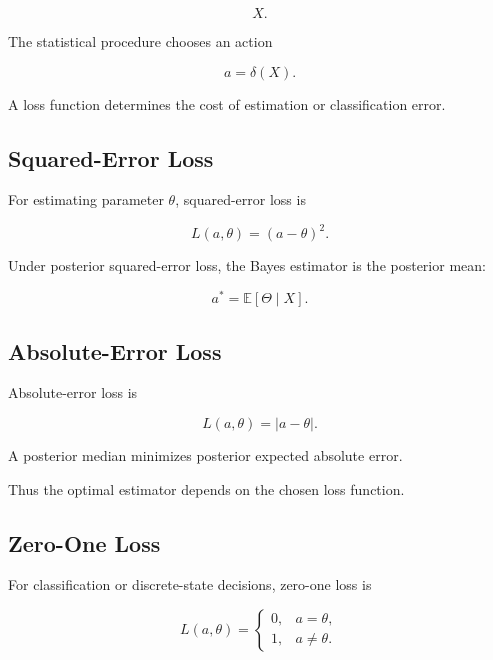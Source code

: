 \[
\boxed{
X.
}
\]

The statistical procedure chooses an action

\[
\boxed{
a=\delta(X).
}
\]

A loss function determines the cost of estimation or classification error.

\subsection{Squared-Error Loss}
\label{subsec:squared-error-loss}

For estimating parameter \(\theta\), squared-error loss is

\[
\boxed{
L(a,\theta)
=
(a-\theta)^2.
}
\]

Under posterior squared-error loss, the Bayes estimator is the posterior
mean:

\[
\boxed{
a^*
=
\mathbb{E}
[
\Theta\mid X
].
}
\]

\subsection{Absolute-Error Loss}
\label{subsec:absolute-error-loss}

Absolute-error loss is

\[
\boxed{
L(a,\theta)
=
|a-\theta|.
}
\]

A posterior median minimizes posterior expected absolute error.

Thus the optimal estimator depends on the chosen loss function.

\subsection{Zero-One Loss}
\label{subsec:zero-one-loss}

For classification or discrete-state decisions, zero-one loss is

\[
\boxed{
L(a,\theta)
=
\begin{cases}
0,
&
a=\theta,
\\
1,
&
a\neq\theta.
\end{cases}
}
\]

